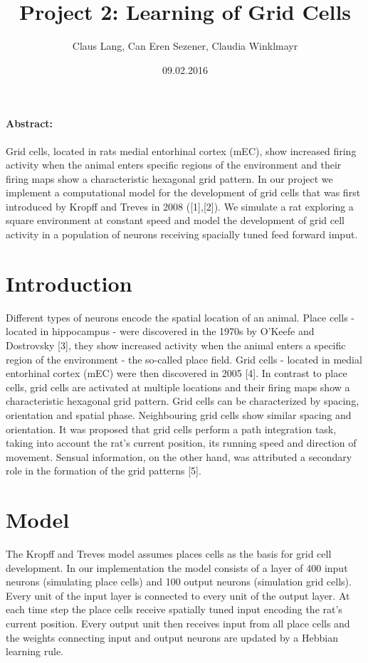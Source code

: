 \documentclass[a4paper, 12pt]{article}
\title{Project 2: Learning of Grid Cells}
\author{Claus Lang, Can Eren Sezener, Claudia Winklmayr}
\date{09.02.2016}
\begin{document}
\maketitle

\paragraph{Abstract:}
Grid cells, located in rats medial entorhinal cortex (mEC), show increased firing activity when the animal enters specific regions of the environment and their firing maps show a characteristic hexagonal grid pattern. In our project we implement a computational model for the development of grid cells that was first introduced by Kropff and Treves in 2008 ([1],[2]). We simulate a rat exploring a square environment at constant speed and model the development of grid cell activity in a population of neurons receiving spacially tuned feed forward imput. 
 

\section{Introduction}
Different types of neurons encode the spatial location of an animal. Place cells - located in hippocampus - were discovered in the 1970s by O'Keefe and Dostrovsky [3], they show increased activity when the animal enters a specific region of the environment - the so-called place field.\newline
Grid cells - located in medial entorhinal cortex (mEC) were then discovered in 2005 [4]. In contrast to place cells, grid cells are activated at multiple locations and their firing maps show a characteristic hexagonal grid pattern. Grid cells can be characterized by spacing, orientation and spatial phase. Neighbouring grid cells show similar spacing and orientation. \newline
It was proposed that grid cells perform a path integration task, taking into account the rat's current position, its running speed and direction of movement. Sensual information, on the other hand, was attributed a secondary role in the formation of the grid patterns [5]. \newline
%
%
%
\section{Model}
The Kropff and Treves model assumes places cells as the basis for grid cell development. In our implementation the model consists of a layer of 400 input neurons (simulating place cells) and 100 output neurons (simulation grid cells). Every unit of the input layer is connected to every unit of the output layer. At each time step the place cells receive spatially tuned input encoding the rat's current position. Every output unit then receives input from all place cells and the weights connecting input and output neurons are updated by a Hebbian learning rule. 
\end{document}
